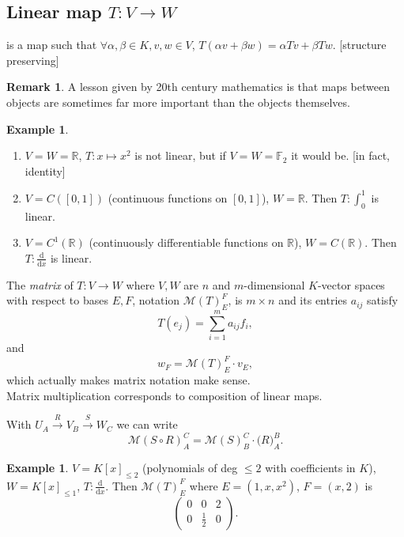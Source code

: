 \documentclass[a4paper]{article}
\theoremstyle{definition}
\newtheorem{example}[defn]{Example}
\newtheorem*{remark}{Remark}
\begin{document}
\subsection{Linear map $T:V\rightarrow W$}
is a map such that $\forall \alpha, \beta \in K, v,w\in V$, $T(\alpha v + \beta w) = \alpha Tv + \beta Tw$. [structure preserving]

\begin{remark}
	A lesson given by 20th century mathematics is that maps between objects are sometimes far more important than the objects themselves.
\end{remark}

\begin{example}
\begin{enumerate}
	\item $V=W=\mathbb R$, $T:x \mapsto x^2$ is not linear, but if $V=W=\mathbb F_2$ it would be. [in fact, identity]
	\item $V=C ([0,1])$ (continuous functions on $[0,1]$), $W=\mathbb R$. Then $T: \int_0^1$ is linear.
	\item $V=C^1 (\mathbb R)$ (continuously differentiable functions on $\mathbb R$), $W=C (\mathbb R)$. Then $T: \frac{\mathrm d}{\mathrm d x}$ is linear.
\end{enumerate}
\end{example}

The \textit{matrix} of $T:V\rightarrow W$ where $V,W$ are $n$ and $m$-dimensional $K$-vector spaces with respect to bases $E,F$, notation $\mathcal M(T)_E^F$, is $m\times n$ and its entries $a_{ij}$ satisfy
\[
T(e_j)=\sum_{i=1}^m a_{ij} f_i ,
\]
and
\[
w_F=\mathcal M (T)_E^F \cdot v_E ,
\]
which actually makes matrix notation make sense. \\

Matrix multiplication corresponds to composition of linear maps.

With $U_A \xrightarrow{R} V_B \xrightarrow{S} W_C$ we can write
\[
\mathcal M (S\circ R)_A^C = \mathcal M (S)_B^C \cdot \mathcal (R)_A^B .
\]

\begin{example}
	$V=K[x]_{\leq 2}$ (polynomials of deg $\leq 2$ with coefficients in $K$), $W=K[x]_{\leq 1}$, $T:\frac{\mathrm d}{\mathrm d x}$. Then $\mathcal M(T)_E^F$ where $E=(1,x,x^2)$, $F=(x,2)$ is
\[
\begin{pmatrix}
		0 & 0 & 2 \\ 0 & \frac12 & 0
	\end{pmatrix} .
\]
\end{example}
\end{document}
